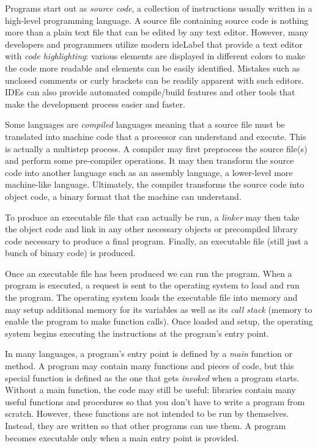 Programs start out as \emph{source code}, a collection of instructions 
usually written in a high-level programming language.  A source file 
containing source code is nothing
more than a plain text file that can be edited by any text editor.  However, many 
developers and programmers utilize modern \gls{ideLabel} 
that provide a text editor with \emph{code highlighting}: various elements are 
displayed in different colors to make the code more readable and elements
can be easily identified.  Mistakes such as unclosed comments or curly brackets
can be readily apparent with such editors.  IDEs can also provide automated 
compile/build features and other tools that make the development process easier
and faster.

Some languages are \emph{compiled}  languages 
meaning that a source file must be translated into machine code that 
a processor can understand and execute.  This is actually a multistep 
process.  A compiler may first preprocess the source file(s) and perform 
some pre-compiler operations.  It may then transform the source code into 
another language such as an assembly language, a lower-level more 
machine-like language.  Ultimately, the compiler transforms the source
code into object code, a binary format that the machine can understand.  

To produce an executable file that can actually be run, a \emph{linker} may then
take the object code and link in any other necessary objects or precompiled
library code necessary to produce a final program.  Finally, an executable
file (still just a bunch of binary code) is produced.

Once an executable file has been produced we can run the program.  
When a program is executed, a request
is sent to the operating system to load and run the program.  The operating 
system loads the executable file into memory and may setup additional memory
for its variables as well as its \emph{call stack} 
(memory to enable the program
to make function calls).  Once loaded and setup, the operating system begins
executing the instructions at the program's entry point.  

In many languages, a program's entry point is defined by a \emph{main} function
or method.  A program may contain many functions and pieces of code, but this
special function is defined as the one that gets \emph{invoked} 
when a program starts.  
Without a main function, the code may still be useful: libraries contain many 
useful functions and procedures so that you don't have to write a program 
from scratch.  However, these functions are not intended to be run by themselves.
Instead, they are written so that other programs can use them.  A program
becomes executable only when a main entry point is provided.  

